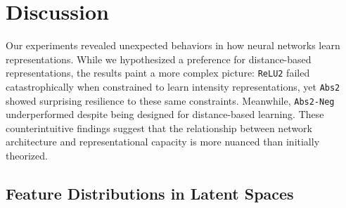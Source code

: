 \section{Discussion}
\label{sec:discussion}

Our experiments revealed unexpected behaviors in how neural networks learn representations. While we hypothesized a preference for distance-based representations, the results paint a more complex picture: \texttt{ReLU2} failed catastrophically when constrained to learn intensity representations, yet \texttt{Abs2} showed surprising resilience to these same constraints. Meanwhile, \texttt{Abs2-Neg} underperformed despite being designed for distance-based learning. These counterintuitive findings suggest that the relationship between network architecture and representational capacity is more nuanced than initially theorized.
\subsection{Feature Distributions in Latent Spaces}

